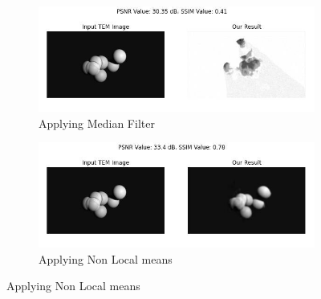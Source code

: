 \begin{figure}[H]
    \begin{subfigure}{.47\textwidth} %
        \includegraphics[width=\textwidth]{img/Results/Synthetic data/Blender_Data_4_median_filter.jpg}
        \caption{Applying Median Filter}
        \label{fig:Image3}
    \end{subfigure}
    \hfill
    \begin{subfigure}{.47\textwidth} %
        \includegraphics[width=\textwidth]{img/Results/Synthetic data/Blender_Data_4_non_local_means.jpg}
        \caption{Applying Non Local means}
        \label{fig:Synthetic_Dataset_Results_Image4}
    \end{subfigure}
    
    \vspace{15pt} %
    

\end{figure}
